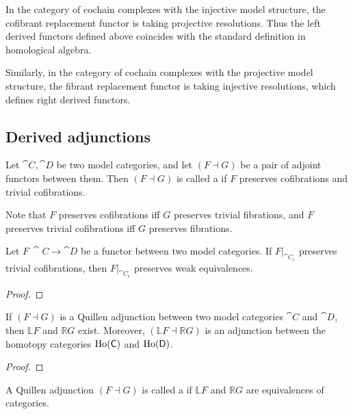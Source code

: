 \begin{example}
    In the category of cochain complexes with the injective model structure,
    the cofibrant replacement functor is taking projective resolutions.
    Thus the left derived functors defined above coincides with
    the standard definition in homological algebra.

    Similarly, in the category of cochain complexes with the projective model structure,
    the fibrant replacement functor is taking injective resolutions,
    which defines right derived functors. \varqed
\end{example}

\subsection{Derived adjunctions}

\nex

\begin{definition}
    Let $\cat C,\cat D$ be two model categories,
    and let $(F\dashv G)$ be a pair of adjoint functors between them.
    Then $(F\dashv G)$ is called a 
    if $F$ preserves cofibrations and trivial cofibrations.
\end{definition}

Note that $F$ preserves cofibrations iff $G$ preserves trivial fibrations,
and $F$ preserves trivial cofibrations iff $G$ preserves fibrations.

\begin{lemma}
    Let $F\:\cat C\to\cat D$ be a functor between two model categories.
    If $F|_{\cat C_{\mathrm c}}$ preserves trivial cofibrations,
    then $F|_{\cat C_{\mathrm c}}$ preserves weak equivalences.
\end{lemma}

\begin{proof}
    \nyw
\end{proof}

\begin{corollary}
    If $(F\dashv G)$ is a Quillen adjunction
    between two model categories $\cat C$ and $\cat D$,
    then $\mathbb LF$ and $\mathbb RG$ exist.
    Moreover, $(\mathbb LF\dashv\mathbb RG)$
    is an adjunction between the homotopy categories $\operatorname{Ho}(\mathsf{C})$ and $\operatorname{Ho}(\mathsf{D})$.
\end{corollary}

\begin{proof}
    \nyw
\end{proof}

\begin{definition}
    A Quillen adjunction $(F\dashv G)$
    is called a  if
    $\mathbb LF$ and $\mathbb RG$ are equivalences of categories.
\end{definition}
